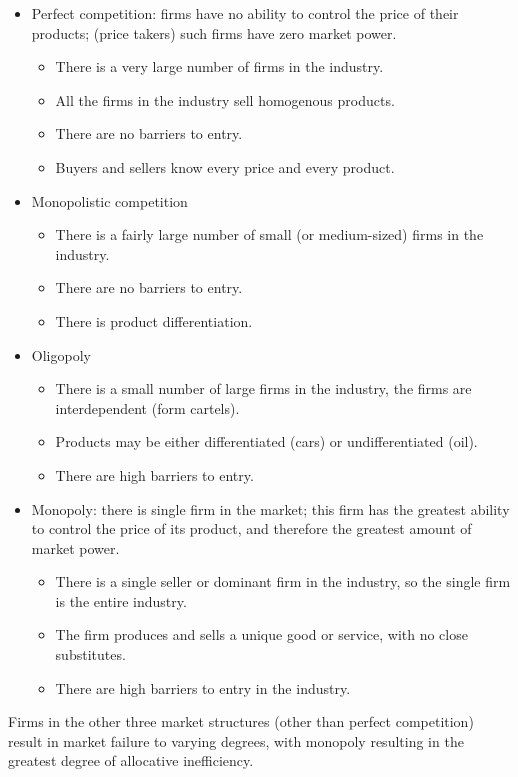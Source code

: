\begin{itemize}
  \item Perfect competition: firms have no ability to control the price of their products; (price takers) such firms have zero market power.
  \begin{itemize}
    \item There is a very large number of firms in the industry.
    \item All the firms in the industry sell homogenous products.
    \item There are no barriers to entry.
\item Buyers and sellers know every price and every product.
  \end{itemize}
  \item Monopolistic competition
  \begin{itemize}
    \item There is a fairly large number of small (or medium-­sized) firms in the industry.
    \item There are no barriers to entry.
    \item There is product differentiation.
  \end{itemize}
  \item Oligopoly
  \begin{itemize}
    \item There is a small number of large firms in the industry, the firms are interdependent (form cartels).
    \item Products may be either differentiated (cars) or undifferentiated (oil).
    \item There are high barriers to entry.
  \end{itemize}
  \item Monopoly: there is single firm in the market; this firm has the greatest ability to control the price of its product, and therefore the greatest amount of market power.
  \begin{itemize}
    \item There is a single seller or dominant firm in the industry, so the single firm is the entire industry.
    \item The firm produces and sells a unique good or service, with no close substitutes.
    \item There are high barriers to entry in the industry.
  \end{itemize}
\end{itemize}
Firms in the other three market structures (other than perfect competition) result in market failure to varying degrees, with monopoly resulting in the greatest degree of allocative inefficiency.\\
